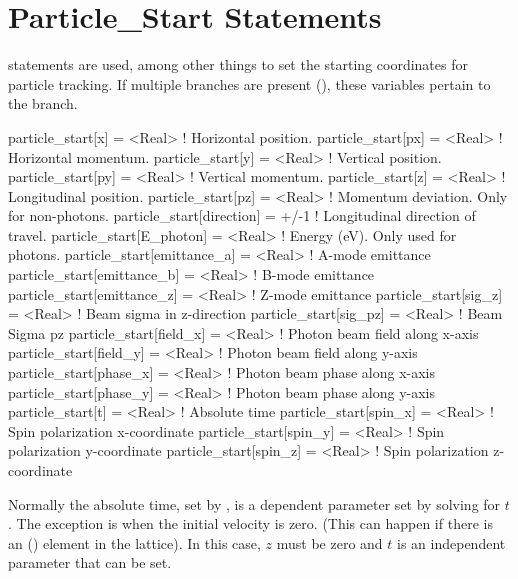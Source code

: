\section{Particle_Start Statements} 
\label{s:beam.start}

 statements are used, among other things to set the starting coordinates
for particle tracking. If multiple branches are present (), these
variables pertain to the  branch.
\begin{example}
  particle_start[x]                   = <Real>   ! Horizontal position.
  particle_start[px]                  = <Real>   ! Horizontal momentum.
  particle_start[y]                   = <Real>   ! Vertical position.
  particle_start[py]                  = <Real>   ! Vertical momentum.
  particle_start[z]                   = <Real>   ! Longitudinal position.
  particle_start[pz]                  = <Real>   ! Momentum deviation. Only for non-photons.
  particle_start[direction]           = +/-1     ! Longitudinal direction of travel.
  particle_start[E_photon]            = <Real>   ! Energy (eV). Only used for photons.
  particle_start[emittance_a]         = <Real>   ! A-mode emittance
  particle_start[emittance_b]         = <Real>   ! B-mode emittance
  particle_start[emittance_z]         = <Real>   ! Z-mode emittance
  particle_start[sig_z]               = <Real>   ! Beam sigma in z-direction
  particle_start[sig_pz]              = <Real>   ! Beam Sigma pz 
  particle_start[field_x]             = <Real>   ! Photon beam field along x-axis
  particle_start[field_y]             = <Real>   ! Photon beam field along y-axis
  particle_start[phase_x]             = <Real>   ! Photon beam phase along x-axis
  particle_start[phase_y]             = <Real>   ! Photon beam phase along y-axis
  particle_start[t]                   = <Real>   ! Absolute time
  particle_start[spin_x]              = <Real>   ! Spin polarization x-coordinate
  particle_start[spin_y]              = <Real>   ! Spin polarization y-coordinate
  particle_start[spin_z]              = <Real>   ! Spin polarization z-coordinate
\end{example}
Normally the absolute time, set by , is a dependent
parameter set by solving  for $t$. The exception is when the
initial velocity is zero. (This can happen if there is an 
() element in the lattice). In this case, $z$ must be
zero and $t$ is an independent parameter that can be set.

